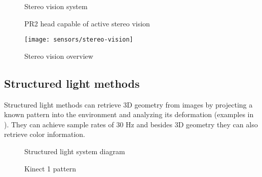 \begin{figure}[H]
	\begin{floatrow}[2]
		{\caption[Stereo vision system]{Stereo vision system \cite{Kaczurba2013}}\label{fig:stereo-cameras}}

		{\caption[PR2 head capable of active stereo vision]{PR2 head capable of active stereo vision\protect\footnotemark}\label{fig:pr2-active-stereo}}
	\end{floatrow}
\end{figure}


\begin{figure}[H]
	\centering
	\texttt{[image: sensors/stereo-vision]}
	\caption[Stereo vision overview]{Stereo vision overview \cite{Yang2014}}
	\label{fig:stereo-vision}
\end{figure}


\subsection{Structured light methods}

Structured light methods can retrieve 3D geometry from images by projecting a known pattern into the environment and analyzing its deformation (examples in ). They can achieve sample rates of 30 Hz and besides 3D geometry they can also retrieve color information.


\begin{figure}[H]
	\begin{floatrow}[2]
		{\caption[Structured light system diagram]{Structured light system diagram\protect\footnotemark}\label{fig:structured-light}}

		{\caption[Kinect 1  pattern]{Kinect 1  pattern\protect\footnotemark}\label{fig:kinect1-ir}}
	\end{floatrow}
\end{figure}


